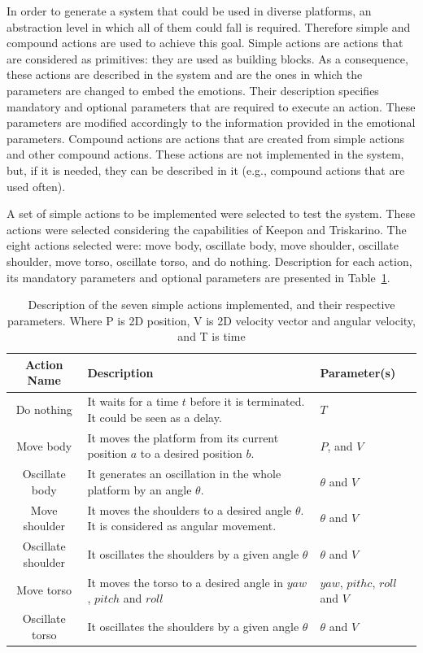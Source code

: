 In order to generate a system that could be used in diverse platforms, an abstraction level in which all of them could fall is required. Therefore simple and compound actions are used to achieve this goal. Simple actions are actions that are considered as primitives: they are used as building blocks. As a consequence, these actions are described in the system and are the ones in which the parameters are changed to embed the emotions. Their description specifies mandatory and optional parameters that are required to execute an action. These parameters are modified accordingly to the information provided in the emotional parameters. Compound actions are actions that are created from simple actions and other compound actions. These actions are not implemented in the system, but, if it is needed, they can be described in it (e.g., compound actions that are used often).

A set of simple actions to be implemented were selected to test the system. These actions were selected considering the capabilities of Keepon and Triskarino. The eight actions selected were: move body, oscillate body, move shoulder, oscillate shoulder, move torso, oscillate torso, and do nothing. Description for each action, its mandatory parameters and optional parameters are presented in Table~\ref{table:actions_implemented}.

\begin{table}
\centering
\caption{Description of the seven simple actions implemented, and their respective parameters. Where  P is 2D position, V is 2D velocity vector and angular velocity, and T is time}
\label{table:actions_implemented}
\begin{tabular}{|c|p{3.9cm}|p{1.4cm}|}
\hline
\textbf{Action Name}& \textbf{Description} &\textbf{Parameter(s)} \\
\hline
Do nothing & It waits for a time $t$ before it is terminated. It could be seen as a delay.  & $T$\\
\hline
Move body & It moves the platform from its current position $a$ to a desired position $b$. & $P$, and $V$\\
\hline
Oscillate body & It generates an oscillation in the whole platform by an angle $\theta$. &  $\theta$ and $V$ \\
\hline
Move shoulder & It moves the shoulders to a desired angle $\theta$. It is considered as angular movement. & $\theta$ and $V$ \\
\hline
Oscillate shoulder & It oscillates the shoulders by a given angle $\theta$ & $\theta$ and $V$\\
\hline
Move torso & It moves the torso to a desired angle in $yaw$, $pitch$ and $roll$& $yaw$, $pithc$, $roll$ and $V$\\
\hline
Oscillate torso & It oscillates the shoulders by a given angle $\theta$ & $\theta$ and $V$\\  
\hline
\end{tabular}
\end{table}

